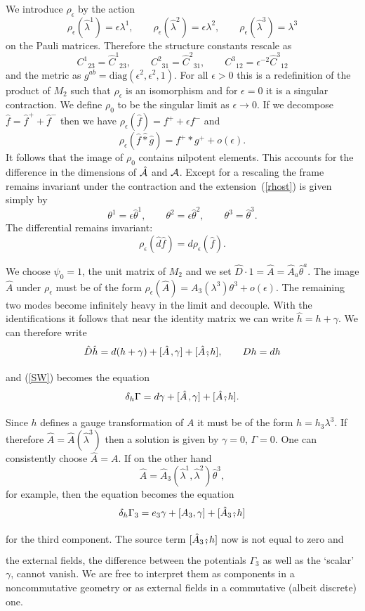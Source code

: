 \documentclass[a4paper,12pt]{article}
\def\h#1{\hat #1}
\def\c#1{{\cal #1}}
\def\wm{\mathbin{*}}
\def\hwm{\mathbin{\hat *}}
\def\k{\kern-.1em\mathbin{,}\kern-.1em}
\def\hk{\kern.12em\raise-1em\hbox{$\hat{\raise1em\hbox{,}}$}\kern.12em}
\begin{document}
We introduce $\rho_\epsilon$ by the action
$$
\rho_\epsilon (\h{\lambda^1}) = \epsilon \lambda^1, \qquad
\rho_\epsilon (\h{\lambda^2}) = \epsilon \lambda^2, \qquad
\rho_\epsilon (\h{\lambda^3}) = \lambda^3
$$
on the Pauli matrices. Therefore the structure constants rescale as
$$
C^1{}_{23} = \h{C}^1{}_{23}, \qquad 
C^2{}_{31} = \h{C}^2{}_{31}, \qquad
C^3{}_{12} = \epsilon^{-2} \h{C}^3{}_{12}
$$
and the metric as $g^{ab} = \mbox{diag}(\epsilon^2, \epsilon^2, 1)$.
For all $\epsilon > 0$ this is a redefinition of the product of
$M_2$ such that $\rho_\epsilon$ is an isomorphism and for 
$\epsilon = 0$ it is a singular contraction.  We define $\rho_0$ to be
the singular limit as $\epsilon \to 0$. If we decompose 
$\h{f} = \h{f}^+ + \h{f}^-$ then we have 
$\rho_\epsilon(\h{f}) = f^+ + \epsilon f^-$ and
$$
\rho_\epsilon(\h{f} \hwm \h{g}) = f^+ \wm g^+ + o(\epsilon).
$$
It follows that the image of $\rho_0$ contains nilpotent elements. This
accounts for the difference in the dimensions of $\h{\c{A}}$ and $\c{A}$.
Except for a rescaling the frame remains invariant under the
contraction and the extension~(\ref{rhost}) is given simply by
$$
\theta^1 = \epsilon \h{\theta}^1, \qquad
\theta^2 = \epsilon \h{\theta}^2, \qquad
\theta^3 = \h{\theta}^3.
$$
The differential remains invariant: 
$$
\rho_\epsilon (\h{d}\h{f}) = d \rho_\epsilon(\h{f}).
$$

We choose $\psi_0 = 1$, the unit matrix of $M_2$ and we set 
$\h{D} \cdot 1 = \h{A} = \h{A}_a \h{\theta}^a$. The image $\h{A}$
under $\rho_\epsilon$ must be of the form 
$\rho_\epsilon(\h{A}) = A_3(\lambda^3) \theta^3 + o(\epsilon)$. The
remaining two modes become infinitely heavy in the limit and decouple.
With the identifications it follows that near the identity matrix we
can write $\h{h} = h + \gamma$.  We can therefore write
$$
\h{D} \h{h} = d(h + \gamma) + [\h{A} \k \gamma] + [\h{A} \hk h], 
\qquad Dh = dh
$$
and (\ref{SW}) becomes the equation
$$
\delta_h \Gamma = d\gamma + [\h{A} \k \gamma] + [\h{A} \hk h].
$$
Since $h$ defines a gauge transformation of $A$ it must be of the
form $h = h_3\lambda^3$. If therefore $\h{A} = \h{A}(\h{\lambda^3})$
then a solution is given by $\gamma = 0$, $\Gamma = 0$.  One can
consistently choose $\h{A} = A$. If on the other hand
$$
\h{A} = \h{A}_3(\h{\lambda}^1,\h{\lambda}^2) \h{\theta^3},
$$ 
for example, then the equation becomes the equation
\begin{equation}
\delta_h \Gamma_3 = e_3 \gamma + [A_3, \gamma] + 
[\h{A}_3 \hk h]                                          \label{SW-eg}
\end{equation}
for the third component. The source term $[\h{A}_3 \hk h]$ now is not
equal to zero and the external fields, the difference between the
potentials $\Gamma_3$ as well as the `scalar' $\gamma$, cannot vanish.
We are free to interpret them as components in a noncommutative
geometry or as external fields in a commutative (albeit discrete) one.
\end{document}
